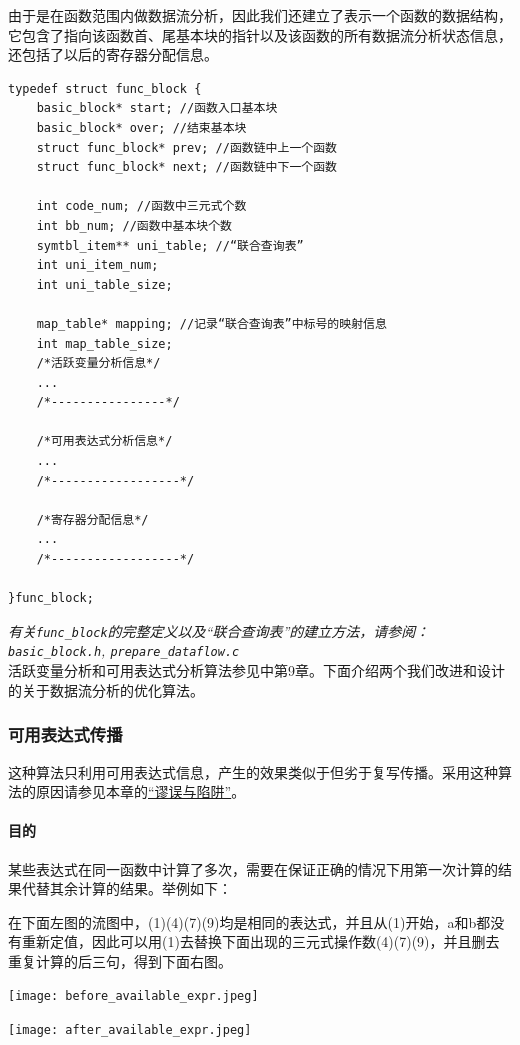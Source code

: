 由于是在函数范围内做数据流分析，因此我们还建立了表示一个函数的数据结构，它包含了指向该函数首、尾基本块的指针以及该函数的所有数据流分析状态信息，还包括了以后的寄存器分配信息。
\begin{lstlisting}
typedef struct func_block {
	basic_block* start; //函数入口基本块
	basic_block* over; //结束基本块
	struct func_block* prev; //函数链中上一个函数
	struct func_block* next; //函数链中下一个函数

	int code_num; //函数中三元式个数
	int bb_num; //函数中基本块个数
	symtbl_item** uni_table; //“联合查询表”
	int uni_item_num;
	int uni_table_size;
	
	map_table* mapping; //记录“联合查询表”中标号的映射信息
	int map_table_size;	
	/*活跃变量分析信息*/
	... 
	/*----------------*/
	
	/*可用表达式分析信息*/
	...
	/*------------------*/
	
	/*寄存器分配信息*/
	...
	/*------------------*/

}func_block;
\end{lstlisting}
{\it \anchor 有关\verb|func_block|的完整定义以及“联合查询表”的建立方法，请参阅：\verb|basic_block.h|, \verb|prepare_dataflow.c|}\\

活跃变量分析和可用表达式分析算法参见\cite{sunjiasu}中第9章。下面介绍两个我们改进和设计的关于数据流分析的优化算法。
\subsubsection{可用表达式传播}
这种算法只利用可用表达式信息，产生的效果类似于但劣于复写传播。采用这种算法的原因请参见本章的\hyperref[pitfallc2]{“谬误与陷阱”}。

\paragraph*{目的}某些表达式在同一函数中计算了多次，需要在保证正确的情况下用第一次计算的结果代替其余计算的结果。举例如下：

在下面左图的流图中，(1)(4)(7)(9)均是相同的表达式，并且从(1)开始，a和b都没有重新定值，因此可以用(1)去替换下面出现的三元式操作数(4)(7)(9)，并且删去重复计算的后三句，得到下面右图。
\begin{center}
\begin{minipage}{0.4\textwidth}
\begin{center}
	\texttt{[image: before\_available\_expr.jpeg]}
\end{center}
\end{minipage}
\begin{minipage}{0.4\textwidth}
\begin{center}
	\texttt{[image: after\_available\_expr.jpeg]}
\end{center}
\end{minipage}
\end{center}

